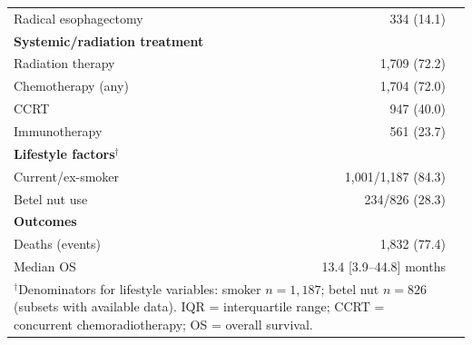 \documentclass[12pt,a4paper]{article}
\begin{document}
\begin{table}[H]
\begin{tabular}{lrr}
    \quad Radical esophagectomy   & 334 (14.1) \\
    \addlinespace
    \textbf{Systemic/radiation treatment} & \\
    \quad Radiation therapy       & 1,709 (72.2) \\
    \quad Chemotherapy (any)      & 1,704 (72.0) \\
    \quad CCRT                    & 947 (40.0) \\
    \quad Immunotherapy           & 561 (23.7) \\
    \addlinespace
    \textbf{Lifestyle factors}$^\dagger$ & \\
    \quad Current/ex-smoker       & 1,001/1,187 (84.3) \\
    \quad Betel nut use           & 234/826 (28.3) \\
    \addlinespace
    \textbf{Outcomes} & \\
    \quad Deaths (events)         & 1,832 (77.4) \\
    \quad Median OS               & 13.4 [3.9--44.8] months \\
    \bottomrule
    \multicolumn{2}{p{0.72\textwidth}}{\small $^\dagger$Denominators for lifestyle
      variables: smoker $n = 1{,}187$; betel nut $n = 826$ (subsets with available
      data). IQR = interquartile range; CCRT = concurrent chemoradiotherapy;
      OS = overall survival.}
  \end{tabular}
\end{table}

\clearpage
\end{document}
